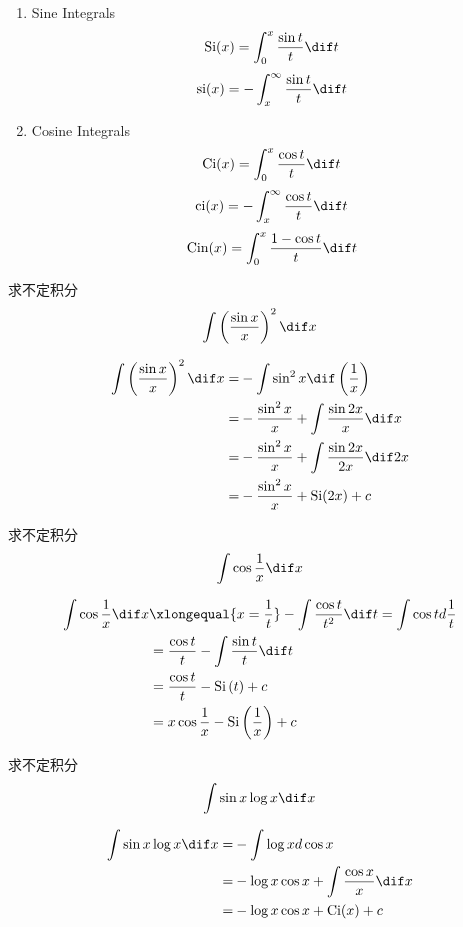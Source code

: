 \documentclass[color=green,titlestyle=hang]{elegantbook}%
\begin{document}
\begin{newdef}[三角积分函数]
\begin{enumerate}
	\item Sine Integrals \[{\rm Si}(x)=\int_0^x\frac{\sin t}{t}\dif t\]
	\[{\rm si}(x)=-\int_{x}^{\infty}\frac{\sin t}{t}\dif t\]
	\item Cosine Integrals \[{\rm Ci}(x)=\int_0^x\frac{\cos t}{t}\dif t\]
	\[{\rm ci}(x)=-\int_x^{\infty}\frac{\cos t}{t}\dif t\]
	\[{\rm Cin}(x)=\int_0^x\frac{1-\cos t}{t}\dif t\]
\end{enumerate}	
\end{newdef}

\begin{example}求不定积分\[\int\left(\frac{\sin x}{x}\right)^2\dif x\]
\end{example}\begin{Solution}\begin{align*}\int\left(\frac{\sin x}{x}\right)^2\dif x
=&-\int\sin^2x \dif \left(\frac{1}{x}\right)\\
=&-\frac{\sin^2x}{x}+\int\frac{\sin{2x}}{x}\dif x\\
=&-\frac{\sin^2x}{x}+\int\frac{\sin{2x}}{2x}\dif 2x\\
=&-\frac{\sin^2x}{x}+\mathrm{Si}(2x)+c
\end{align*}
\end{Solution}

\begin{exercise}求不定积分\[\int {\cos \frac{1}{x}} \dif x\]
\end{exercise}\begin{Solution}\begin{align*}
\int {\cos \frac{1}{x}} \dif x &\xlongequal{x=\frac{1}{t}}- \int {\frac{{\cos t}}{{{t^2}}}} \dif t= \int {\cos t} d\frac{1}{t}\\
&=\frac{{\cos t}}{t} - \int {\frac{{\sin t}}{t}} \dif t\\
& =\frac{{\cos t}}{t} - \mathrm{Si}\left( t \right) + c\\
&= x\cos \frac{1}{x} - \mathrm{Si}\left( {\frac{1}{x}} \right) + c
\end{align*}
\end{Solution}

\begin{exercise}求不定积分\[\int\sin x\log x\dif x\]
\end{exercise}\begin{Solution}\begin{align*}\int\sin x\log x\dif x=&-\int\log xd\cos x\\
=&-\log x\cos x+\int\frac{\cos x}{x}\dif x\\
=&-\log x\cos x+\textrm{Ci}(x)+c
\end{align*}
\end{Solution}
\end{document}
